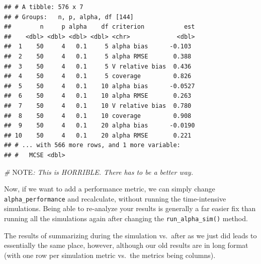 \documentclass[
]{book}
\newenvironment{Shaded}{\begin{snugshade}}{\end{snugshade}}
\newcommand{\AlertTok}[1]{\textcolor[rgb]{0.94,0.16,0.16}{#1}}
\newcommand{\AttributeTok}[1]{\textcolor[rgb]{0.77,0.63,0.00}{#1}}
\newcommand{\CommentTok}[1]{\textcolor[rgb]{0.56,0.35,0.01}{\textit{#1}}}
\newcommand{\FunctionTok}[1]{\textcolor[rgb]{0.00,0.00,0.00}{#1}}
\newcommand{\NormalTok}[1]{#1}
\newcommand{\OtherTok}[1]{\textcolor[rgb]{0.56,0.35,0.01}{#1}}
\newcommand{\SpecialCharTok}[1]{\textcolor[rgb]{0.00,0.00,0.00}{#1}}
\newcommand{\StringTok}[1]{\textcolor[rgb]{0.31,0.60,0.02}{#1}}
\begin{document}
\begin{Shaded}
\end{Shaded}

\begin{verbatim}
## # A tibble: 576 x 7
## # Groups:   n, p, alpha, df [144]
##        n     p alpha    df criterion           est
##    <dbl> <dbl> <dbl> <dbl> <chr>             <dbl>
##  1    50     4   0.1     5 alpha bias      -0.103 
##  2    50     4   0.1     5 alpha RMSE       0.388 
##  3    50     4   0.1     5 V relative bias  0.436 
##  4    50     4   0.1     5 coverage         0.826 
##  5    50     4   0.1    10 alpha bias      -0.0527
##  6    50     4   0.1    10 alpha RMSE       0.263 
##  7    50     4   0.1    10 V relative bias  0.780 
##  8    50     4   0.1    10 coverage         0.908 
##  9    50     4   0.1    20 alpha bias      -0.0190
## 10    50     4   0.1    20 alpha RMSE       0.221 
## # ... with 566 more rows, and 1 more variable:
## #   MCSE <dbl>
\end{verbatim}

\begin{Shaded}
\begin{Highlighting}[]
\CommentTok{\# }\AlertTok{NOTE}\CommentTok{: This is HORRIBLE.  There has to be a better way.}
\end{Highlighting}
\end{Shaded}

Now, if we want to add a performance metric, we can simply change \texttt{alpha\_performance} and recalculate, without running the time-intensive simulations.
Being able to re-analyze your results is generally a far easier fix than running all the simulations again
after changing the \texttt{run\_alpha\_sim()} method.

The results of summarizing during the simulation vs.~after as we just did
leads to essentially the same place, however, although our old results are in long format (with one row per simulation metric vs.~the metrics being columns).
\end{document}
